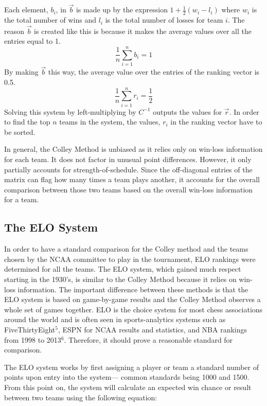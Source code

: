 \documentclass{article}
\begin{document}
Each element, $b_i$, in $\vec{b}$ is made up by the expression $1 + \frac{1}{2}(w_i - l_i)$ where $w_i$ is the total number of wins and $l_i$ is the total number of losses for team $i$. The reason $\vec{b}$ is created like this is because it makes the average values over all the entries equal to 1.
\begin{equation}
\frac{1}{n}\sum_{i=1}^{n} b_{i} = 1
\end{equation}
By making $\vec{b}$ this way, the average value over the entries of the ranking vector is 0.5.
\begin{equation}
\frac{1}{n}\sum_{i=1}^{n} r_{i} = \frac{1}{2}
\end{equation}
Solving this system by left-multiplying by $C^{-1}$ outputs the values for $\vec{r}$. In order to find the top $n$ teams in the system, the values, $r_i$ in the ranking vector have to be sorted.

In general, the Colley Method is unbiased as it relies only on win-loss information for each team. It does not factor in unusual point differences. However, it only partially accounts for strength-of-schedule. Since the off-diagonal entries of the matrix can flag how many times a team plays another, it accounts for the overall comparison between those two teams based on the overall win-loss information for a team.
\subsection{The ELO System}
In order to have a standard comparison for the Colley method and the teams chosen by the NCAA committee to play in the tournament, ELO rankings were determined for all the teams. The ELO system, which gained much respect starting in the 1930's, is similar to the Colley Method because it relies on win-loss information. The important difference between these methods is that the ELO system is based on game-by-game results and the Colley Method observes a whole set of games together. ELO is the choice system for most chess associations around the world and is often seen in sports-analytics systems such as FiveThirtyEight$^{5}$, ESPN for NCAA results and statistics, and NBA rankings from 1998 to 2013$^{6}$. Therefore, it should prove a reasonable standard for comparison.

The ELO system works by first assigning a player or team a standard number of points upon entry into the system--- common standards being 1000 and 1500. From this point on, the system will calculate an expected win chance or result between two teams using the following equation:\\
\end{document}
